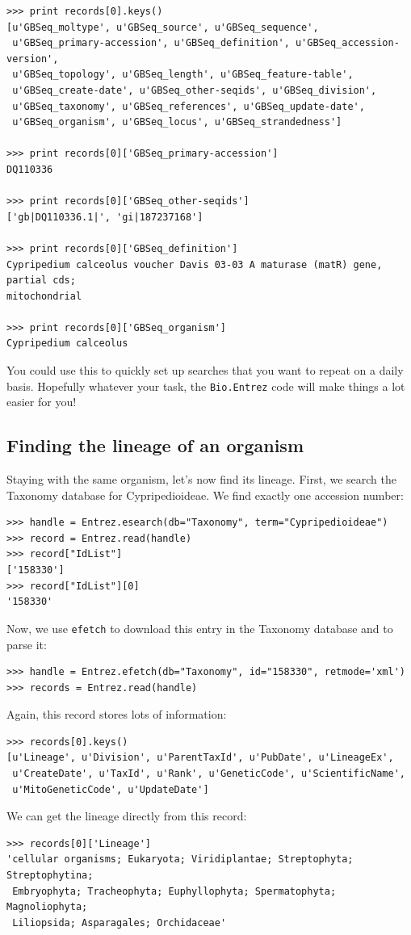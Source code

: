 \documentclass{report}
\begin{document}
\begin{verbatim}
>>> print records[0].keys()
[u'GBSeq_moltype', u'GBSeq_source', u'GBSeq_sequence',
 u'GBSeq_primary-accession', u'GBSeq_definition', u'GBSeq_accession-version',
 u'GBSeq_topology', u'GBSeq_length', u'GBSeq_feature-table',
 u'GBSeq_create-date', u'GBSeq_other-seqids', u'GBSeq_division',
 u'GBSeq_taxonomy', u'GBSeq_references', u'GBSeq_update-date',
 u'GBSeq_organism', u'GBSeq_locus', u'GBSeq_strandedness']

>>> print records[0]['GBSeq_primary-accession']
DQ110336

>>> print records[0]['GBSeq_other-seqids']
['gb|DQ110336.1|', 'gi|187237168']

>>> print records[0]['GBSeq_definition']
Cypripedium calceolus voucher Davis 03-03 A maturase (matR) gene, partial cds;
mitochondrial

>>> print records[0]['GBSeq_organism']
Cypripedium calceolus
\end{verbatim}

You could use this to quickly set up searches that you want to repeat on a daily basis. Hopefully whatever your task, the \verb+Bio.Entrez+ code will make things a lot easier for you!

\subsection{Finding the lineage of an organism}

Staying with the same organism, let's now find its lineage. First, we search the Taxonomy database for Cypripedioideae. We find exactly one accession number:
\begin{verbatim}
>>> handle = Entrez.esearch(db="Taxonomy", term="Cypripedioideae")
>>> record = Entrez.read(handle)
>>> record["IdList"]
['158330']
>>> record["IdList"][0]
'158330'
\end{verbatim}
Now, we use \verb+efetch+ to download this entry in the Taxonomy database and to parse it:
\begin{verbatim}
>>> handle = Entrez.efetch(db="Taxonomy", id="158330", retmode='xml')
>>> records = Entrez.read(handle)
\end{verbatim}
Again, this record stores lots of information:
\begin{verbatim}
>>> records[0].keys()
[u'Lineage', u'Division', u'ParentTaxId', u'PubDate', u'LineageEx',
 u'CreateDate', u'TaxId', u'Rank', u'GeneticCode', u'ScientificName',
 u'MitoGeneticCode', u'UpdateDate']
\end{verbatim}
We can get the lineage directly from this record:
\begin{verbatim}
>>> records[0]['Lineage']
'cellular organisms; Eukaryota; Viridiplantae; Streptophyta; Streptophytina;
 Embryophyta; Tracheophyta; Euphyllophyta; Spermatophyta; Magnoliophyta;
 Liliopsida; Asparagales; Orchidaceae'
\end{verbatim}
\end{document}
